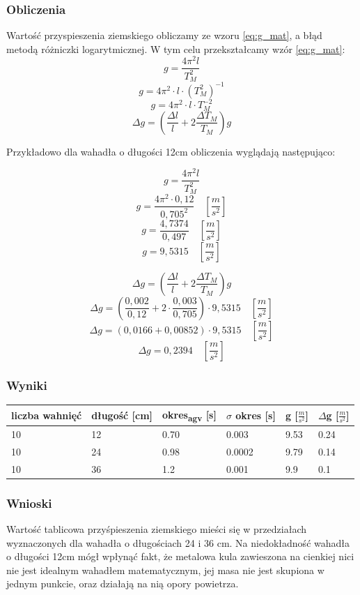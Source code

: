 \documentclass[a4paper, 11pt]{article}
\begin{document}
\subsubsection{Obliczenia}
Wartość przyspieszenia ziemskiego obliczamy ze wzoru \eqref{eq:g_mat},
a błąd metodą różniczki logarytmicznej.
W tym celu przekształcamy wzór \eqref{eq:g_mat}:
\[
	g = \frac{4\pi^2l}{T^2_M}
\]
\[
	g = 4\pi^2 \cdot l \cdot\left(T^2_M\right)^{-1}
\]
\[
	g = 4\pi^2\cdot l \cdot T^{-2}_M
\]
\begin{equation}
	\Delta g = \left( \frac{\Delta l}{l} +2\frac{\Delta T_M}{T_M} \right)g
\end{equation}

Przykładowo dla wahadła o długości 12cm obliczenia wyglądają następująco:
\begin{multicols}{2}
	\[
		g = \frac{4\pi^2l}{T^2_M}
	\]
	\[
		g = \frac{4\pi^2 \cdot 0,12}{0,705^2} \quad [\frac{m}{s^2}]
	\]
	\[
		g = \frac{4,7374}{0,497} \quad[\frac{m}{s^2}]
	\]
	\[
		g = 9,5315 \quad[\frac{m}{s^2}]
	\]

	\columnbreak

	\[
		\Delta g = \left( \frac{\Delta l}{l} +2\frac{\Delta T_M}{T_M} \right)g
	\]
	\[
		\Delta g = \left( \frac{0,002}{0,12} +2 \cdot \frac{0,003}{0,705} \right) \cdot 9,5315 \quad [\frac{m}{s^2}]
	\]
	\[
		\Delta g = \left( 0,0166 + 0,00852 \right) \cdot 9,5315 \quad [\frac{m}{s^2}]
	\]
	\[
		\Delta g = 0,2394 \quad [\frac{m}{s^2}]
	\]
\end{multicols}

\subsubsection{Wyniki}
\begin{center}
	\begin{tabular}{|l|l|l|l|l|l|}
		\hline
		liczba wahnięć & długość [cm] & okres\textsubscript{agv} [s] & $\sigma$ okres [s] & g [$\frac{m}{s^2}$] & $\Delta$g [$\frac{m}{s^2}$] \\ \hline
		10             & 12           & 0.70                         & 0.003              & 9.53                & 0.24                        \\ \hline
		10             & 24           & 0.98                         & 0.0002             & 9.79                & 0.14                        \\ \hline
		10             & 36           & 1.2                          & 0.001              & 9.9                 & 0.1                         \\ \hline
	\end{tabular}
\end{center}

\subsubsection{Wnioski}
Wartość tablicowa przyśpieszenia ziemskiego mieści się w przedziałach wyznaczonych dla wahadła o długościach 24 i 36 cm.
Na niedokładność wahadła o długości 12cm mógł wpłynąć fakt, że metalowa kula zawieszona na cienkiej nici nie jest idealnym wahadłem matematycznym,
jej masa nie jest skupiona w jednym punkcie, oraz działają na nią opory powietrza.
\end{document}
